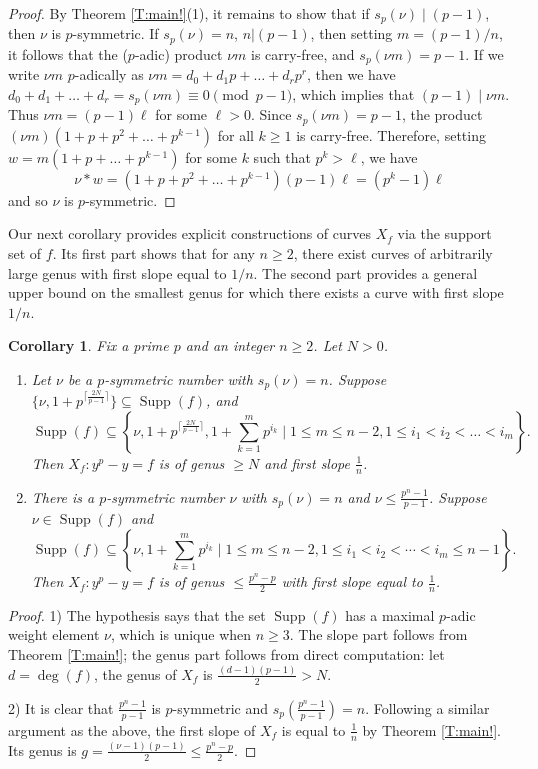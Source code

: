 \documentclass{amsart}
\numberwithin{equation}{section}
\newcommand{\pceil}[1]{\lceil #1 \rceil}
\DeclareMathOperator{\Supp}{Supp}
\theoremstyle{plain}
\newtheorem{corollary}[theorem]{Corollary}
\theoremstyle{definition}
\begin{document}
\begin{proof}
    By Theorem \ref{T:main!}(1), it remains to show that
    if $s_p(\nu) \mid  (p-1)$, then $\nu$ is $p$-symmetric.
    If $s_p(\nu) = n$, $n | (p-1)$,
    then setting $m = (p-1)/n$,
    it follows that the ($p$-adic) product $\nu m$ is carry-free,
    and $s_p(\nu m) = p-1$.
    If we write $\nu m$ $p$-adically as $\nu m = d_0 + d_1p + \dots + d_r p^r$,
    then we have $d_0 + d_1 + \dots + d_r = s_p(\nu m) \equiv 0 \pmod{p-1}$,
    which implies that $(p-1) \mid \nu m$.
    Thus $\nu m = (p-1)\ell$ for some $\ell > 0$.
    Since $s_p(\nu m)=p-1$, 
    the product $(\nu m) (1 + p + p^2 + \dots + p^{k-1})$ for all $k \ge 1$
   is carry-free.
    Therefore, setting $w = m(1 + p + \dots + p^{k-1})$
    for some $k$ such that $p^k > \ell$,
    we have
    \[
        \nu * w = (1 + p + p^2 + \dots + p^{k-1})(p-1)\ell 
        = (p^k - 1)\ell
    \]
    and so $\nu$ is $p$-symmetric.
\end{proof}

Our next corollary provides explicit constructions of curves $X_f$ 
via the support set of $f$. 
Its first part shows that for any $n \ge 2$,
there exist curves of arbitrarily large genus
with first slope equal to $1/n$.
The second part provides a general upper bound on the smallest genus
for which there exists a curve with first slope $1/n$.
\begin{corollary}
\label{T:main!!}
Fix a prime $p$ and an integer $n\ge 2$.
Let $N>0$.
\begin{enumerate}
\item Let $\nu$ be a $p$-symmetric number with $s_p(\nu)=n$. 
Suppose $\{\nu,1+p^{\pceil{\frac{2N}{p-1}}}\}\subseteq \Supp(f)$, and 
$$\Supp(f)\subseteq \left\{
\nu, 1+p^{\pceil{\frac{2N}{p-1}}}, 1+\sum_{k=1}^{m}p^{i_k}\mid 
1\le m\le n-2, 1\le i_1<i_2<\ldots<i_m 
\right\}.
$$
Then 
$X_f: y^p-y=f$ is of genus $\ge N$
and first slope $\frac{1}{n}$.
\item There is a $p$-symmetric number $\nu$ with $s_p(\nu)=n$ and 
$\nu\le \frac{p^n-1}{p-1}$.
Suppose $\nu\in \Supp(f)$ and $$\Supp(f)\subseteq \left\{
\nu, 1+\sum_{k=1}^{m}p^{i_k}\mid 1\le m\le n-2, 1\le i_1<i_2<\cdots <i_m\le n-1\right\}.$$
Then $X_f:y^p-y=f$ is of genus 
$\le \frac{p^n-p}{2}$ with first slope equal to $\frac{1}{n}$.
\end{enumerate}
\end{corollary}

\begin{proof}

1) The hypothesis says that the set $\Supp(f)$ has a maximal $p$-adic weight element $\nu$, which is unique when $n\ge 3$.
The slope part follows from Theorem \ref{T:main!};
the genus part follows from direct computation: let $d=\deg(f)$,
the genus of $X_f$ is 
$\frac{(d-1)(p-1)}{2}>N$. 

2) 
It is clear that $\frac{p^n-1}{p-1}$ is $p$-symmetric and $s_p(\frac{p^n-1}{p-1})=n$.
Following a similar argument as the above, the first slope of $X_f$ is equal to $\frac{1}{n}$ 
by Theorem \ref{T:main!}. 
Its genus is $g=\frac{(\nu-1)(p-1)}{2}\le \frac{p^n-p}{2}$.
\end{proof}
\end{document}
